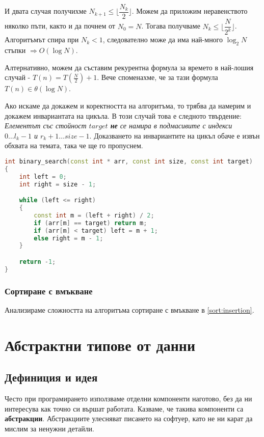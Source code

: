 \documentclass[fleqn,12pt]{article}
\begin{document}
И двата случая получихме $N_{k+1} \leq \Bigg\lfloor \dfrac{N_k}{2} \Bigg\rfloor$.
Можем да приложим неравенството няколко пъти, както и да почнем от $N_0 = N$. 
Тогава получваме $N_k \leq \Bigg\lfloor \dfrac{N}{2^k} \Bigg\rfloor$. Алгоритъмът спира при $N_k < 1$,
следователно може да има най-много $\log_2 N$ стъпки $\Rightarrow O(\log N)$.

Алтернативно, можем да съставим рекурентна формула за времето в най-лошия случай - $T(n) = T\left(\frac{N}{2}\right) + 1$.
Вече споменахме, че за тази формула $T(n) \in \theta(\log N)$. 

Ако искаме да докажем и коректността на алгоритъма, то трябва да намерим и докажем инвариантата на цикъла.
В този случай това е следното твърдение: \textit{Елементът със стойност $target$ \textbf{не} се намира в подмасивите с индекси $0 \dots l_k - 1$ и $r_k + 1 \dots size - 1$}.
Доказването на инвариантите на цикъл обаче е извън обхвата на темата, така че ще го пропуснем.

\begin{lstlisting}[language=C++, caption=Двоично търсене]
int binary_search(const int * arr, const int size, const int target)
{
    int left = 0;
    int right = size - 1;

    while (left <= right)
    {
        const int m = (left + right) / 2;
        if (arr[m] == target) return m;
        if (arr[m] < target) left = m + 1;
        else right = m - 1;
    }

    return -1;
}
\end{lstlisting}
    
\subsubsection{Сортиране с вмъкване}
Анализираме сложността на алгоритъма сортиране с вмъкване в \ref{sort:insertion}.

\section{Абстрактни типове от данни}
\subsection{Дефиниция и идея}
Често при програмирането използваме отделни компоненти наготово, без да ни интересува как точно си вършат работата.
Казваме, че такива компоненти са \textbf{абстракции}. Абстракциите улесняват писането на софтуер, като не ни карат 
да мислим за ненужни детайли.
\end{document}
